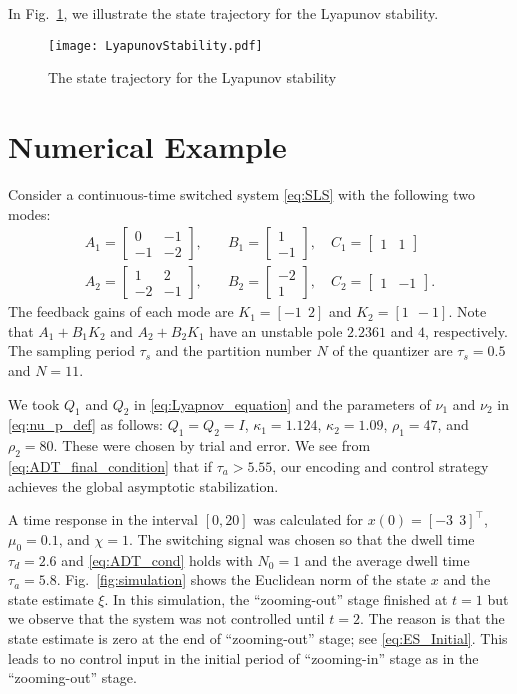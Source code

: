 \documentclass[letterpaper, 11pt, onecolumn]{ieeeconf}  \IEEEoverridecommandlockouts
\begin{document}
In Fig.~\ref{fig:lyap},
we illustrate the state trajectory for the Lyapunov stability.


 \begin{figure}[t]
 \centering
 \texttt{[image: LyapunovStability.pdf]}
 \caption{The state trajectory for the Lyapunov stability}
 \label{fig:lyap}
 \end{figure}


\section{Numerical Example}
Consider a continuous-time switched system \eqref{eq:SLS} 
with the following two modes:
\begin{align*}
A_1 = 
\begin{bmatrix}
0 & -1 \\ -1 & -2
\end{bmatrix},\quad
&B_1 = 
\begin{bmatrix}
1 \\ -1
\end{bmatrix},\quad
C_1 = 
\begin{bmatrix}
1 & 1
\end{bmatrix}\\
A_2 = 
\begin{bmatrix}
1 & 2 \\ -2 & -1
\end{bmatrix},\quad
&B_2 = 
\begin{bmatrix}
-2 \\ 1
\end{bmatrix},\quad
C_2 = 
\begin{bmatrix}
1 & -1
\end{bmatrix}.
\end{align*}
The feedback gains of each mode are
$K_1 = [-1~~2]$ and $K_2 = [1~~-1]$.
Note that $A_1+B_1K_2$ and $A_2 + B_2K_1$
have an unstable pole $2.2361$ and $4$,
respectively.
The sampling period $\tau_s$ and
the partition number $N$ of the quantizer are
$\tau_s = 0.5$ and $N = 11$.

We took $Q_1$ and $Q_2$ in \eqref{eq:Lyapnov_equation} and
the parameters of $\nu_1$ and $\nu_2$ in \eqref{eq:nu_p_def}
as follows: 
$Q_1 = Q_2 = I$, 
$\kappa_1 = 1.124$, $\kappa_2 = 1.09$, 
$\rho_1 = 47$, and $\rho_2 = 80$. These were chosen by
trial and error.
We see from \eqref{eq:ADT_final_condition} that
if $\tau_a > 5.55$, our encoding and control strategy
achieves the global asymptotic stabilization.

A time response in the interval $[0,20]$ was calculated for
$x(0) = [-3~~3]^{\top}$, $\mu_0 = 0.1$, and $\chi = 1$.
The switching signal was chosen so that 
the dwell time $\tau_d = 2.6$ and
\eqref{eq:ADT_cond}
holds with $N_0 =1$ and the average dwell time $\tau_a = 5.8$.
Fig.~\ref{fig:simulation}
shows the Euclidean norm of
the state $x$ and the state estimate $\xi$. 
In this simulation, the ``zooming-out'' stage finished at $t=1$ but we observe that 
the system was not controlled until $t=2$. The reason is that
the state estimate is zero at the end of ``zooming-out'' stage; see \eqref{eq:ES_Initial}.
This leads to no control input in
the initial period of ``zooming-in'' stage as in
the ``zooming-out'' stage.
\end{document}
